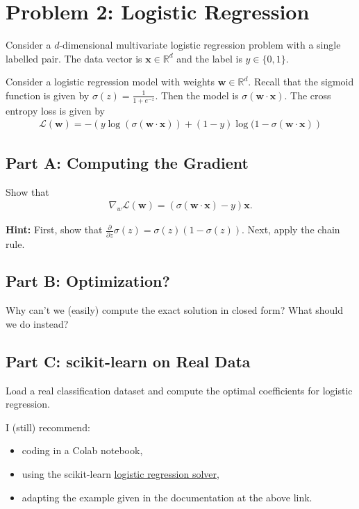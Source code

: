 \documentclass{article}
\begin{document}
%

\newpage
\section*{Problem 2: Logistic Regression}

Consider a $d$-dimensional multivariate logistic regression problem with a single labelled pair.
The data vector is $\mathbf{x} \in \mathbb{R}^d$ and the label is $y \in \{0,1\}$.

Consider a logistic regression model with weights $\mathbf{w} \in \mathbb{R}^d$.
Recall that the sigmoid function is given by $\sigma(z) = \frac1{1+e^{-z}}.$
Then the model is $\sigma(\mathbf{w} \cdot \mathbf{x})$.
The cross entropy loss is given by
\begin{align}
    \mathcal{L}(\mathbf{w})
    = -  \left(y \log(\sigma(\mathbf{w} \cdot \mathbf{x})) + 
    (1-y) \log(1-\sigma(\mathbf{w} \cdot \mathbf{x})\right)
\end{align}

\subsection*{Part A: Computing the Gradient}

Show that 
\begin{align}
    \nabla_w\mathcal{L}(\mathbf{w}) = (\sigma(\mathbf{w} \cdot \mathbf{x})-y)\mathbf{x}.
\end{align}

\textbf{Hint:} First, show that $\frac{\partial}{\partial z} \sigma(z) = \sigma(z) (1- \sigma(z))$. Next, apply the chain rule.

\subsection*{Part B: Optimization?}

Why can't we (easily) compute the exact solution in closed form?
What should we do instead?

\subsection*{Part C: scikit-learn on Real Data}

Load a real classification dataset and compute the optimal coefficients for logistic regression.

I (still) recommend:
\begin{itemize}
    \item coding in a Colab notebook,
    \item using the scikit-learn \href{https://scikit-learn.org/stable/modules/generated/sklearn.linear_model.LogisticRegression.html}{logistic regression solver},
    \item adapting the example given in the documentation at the above link.
\end{itemize}

%
\end{document}
